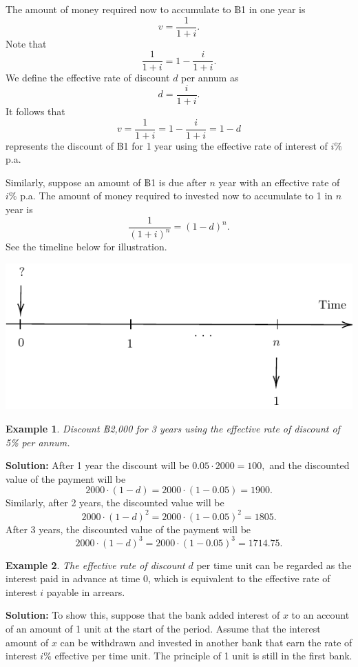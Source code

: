 \documentclass[
]{book}
\theoremstyle{definition}
\theoremstyle{definition}
\newtheorem{example}{Example}[chapter]
\theoremstyle{definition}
\theoremstyle{definition}
\theoremstyle{remark}
\begin{document}
The amount of money required now to accumulate to ฿1 in one year is
\[v =  \frac{1}{1+i}.\] Note that \[\frac{1}{1+i} = 1 - \frac{i}{1+i}.\]
We define the effective rate of discount \(d\) per annum
as\[d = \frac{i}{1+i}.\] It follows that
\[v = \frac{1}{1+i} = 1 - \frac{i}{1+i} =  1 - d\] represents the
discount of ฿1 for 1 year using the effective rate of interest of \(i \%\)
p.a.

Similarly, suppose an amount of ฿1 is due after \(n\) year with an
effective rate of \(i \%\) p.a. The amount of money required to invested
now to accumulate to 1 in \(n\) year is \[\frac{1}{(1+i)^n} = (1-d)^n.\]
See the timeline below for illustration.

\begin{center}\includegraphics{SCMA266Bookdownproj_files/figure-latex/tikz-ex14-1} \end{center}

\begin{example}
\emph{Discount ฿2,000 for 3 years using the effective rate of discount of 5\%
per annum.}
\end{example}

\textbf{Solution:} After 1 year the discount will be \(0.05 \cdot 2000 = 100,\)
and the discounted value of the payment will be
\[2000 \cdot (1 - d) = 2000 \cdot (1 - 0.05) = 1900 .\] Similarly, after
2 years, the discounted value will be
\[2000 \cdot (1 - d)^2 = 2000 \cdot (1 - 0.05)^2 = 1805 .\] After 3
years, the discounted value of the payment will be
\[2000 \cdot (1 - d)^3 = 2000 \cdot (1 - 0.05)^3 = 1714.75 .\]

\begin{example}
\emph{The effective rate of discount} \(d\) per time unit can be regarded as
the interest paid in advance at time 0, which is equivalent to the
effective rate of interest \(i\) payable in arrears.
\end{example}

\textbf{Solution:} To show this, suppose that the bank added interest of \(x\)
to an account of an amount of 1 unit at the start of the period. Assume
that the interest amount of \(x\) can be withdrawn and invested in another
bank that earn the rate of interest \(i\%\) effective per time unit. The
principle of 1 unit is still in the first bank.
\end{document}
